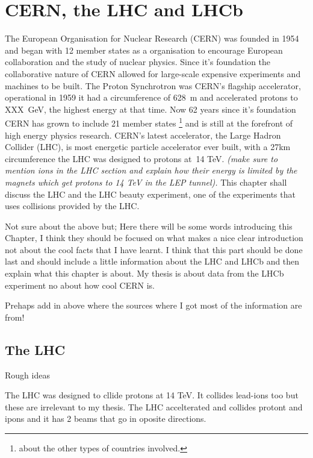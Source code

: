 \chapter{CERN, the LHC and LHCb}
\label{CERN_LHC_LHCb}


The European Organisation for Nuclear Research (CERN) was founded in 1954 and began with 12 member states as a organisation to encourage European collaboration and the study of nuclear physics. Since it's foundation the collaborative nature of CERN allowed for large-scale expensive experiments and machines to be built. The Proton Synchrotron was CERN's flagship accelerator, operational in 1959 it had a circumference of 628~m and accelerated protons to XXX~GeV, the highest energy at that time. Now 62 years since it's foundation CERN has grown to include 21 member states \footnote{about the other types of countries involved.} and is still at the forefront of high energy physics research. CERN’s latest accelerator, the Large Hadron Collider (LHC), is most energetic particle accelerator ever built, with a 27km circumference the LHC was designed to protons at~14 TeV. \textit{(make sure to mention ions in the LHC section and explain how their energy is limited by the magnets which get protons to 14 TeV in the LEP tunnel). }  This chapter shall discuss the LHC and the LHC beauty experiment, one of the experiments that uses collisions provided by the LHC.

Not sure about the above but;
Here there will be some words introducing this Chapter, I think they should be focused on what makes a nice clear introduction not about the cool facts that I have learnt. I think that this part should be done last and should include a little information about the LHC and LHCb and then explain what this chapter is about. My thesis is about data from the LHCb experiment no about how cool CERN is.

Prehaps add in above where the sources where I got most of the information are from!

\section{The LHC}
\label{LHC}

Rough ideas

The LHC was designed to cllide protons at 14 TeV. It collides lead-ions too but these are irrelevant to my thesis. The LHC accelterated and collides protont and ipons and it has 2 beams that go in oposite directions.


